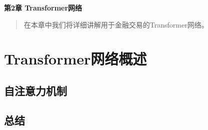 \newpage
\maketitle
\begin{center}
\Large \textbf{第2章 Transformer网络} \quad 
\end{center}
\begin{abstract}
在本章中我们将详细讲解用于金融交易的Transformer网络。
\end{abstract}
\section{Transformer网络概述}
\subsection{自注意力机制}

\subsection{总结}
